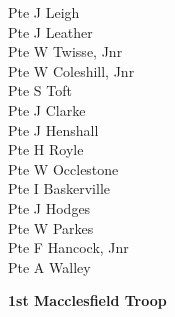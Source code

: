 \begin{multicols}{2}
  Pte J Leigh \\
  Pte J Leather \\
  Pte W Twisse, Jnr \\
  Pte W Coleshill, Jnr \\
  Pte S Toft \\
  Pte J Clarke \\
  Pte J Henshall \\
  Pte H Royle \\
  Pte W Occlestone \\
  Pte I Baskerville \\
  Pte J Hodges \\
  Pte W Parkes \\
  Pte F Hancock, Jnr \\
  Pte A Walley \\
\end{multicols}

\begin{center}
  \Large
  \textbf{1st Macclesfield Troop}
\end{center}

